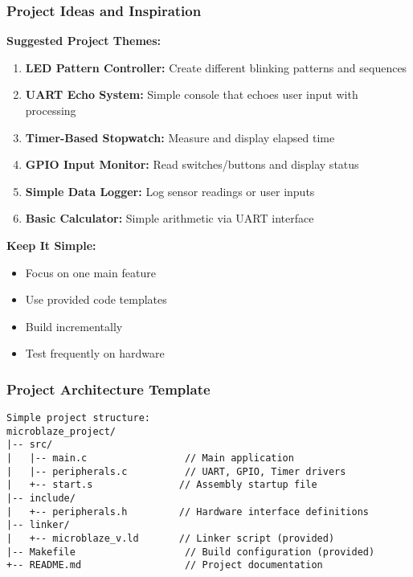 \documentclass{beamer}
\begin{document}
\begin{frame}
\frametitle{Project Ideas and Inspiration}
\small \textbf{Suggested Project Themes:}

\begin{enumerate}
    \item \footnotesize \textbf{LED Pattern Controller:} Create different blinking patterns and sequences
    \item \footnotesize \textbf{UART Echo System:} Simple console that echoes user input with processing
    \item \footnotesize \textbf{Timer-Based Stopwatch:} Measure and display elapsed time
    \item \footnotesize \textbf{GPIO Input Monitor:} Read switches/buttons and display status
    \item \footnotesize \textbf{Simple Data Logger:} Log sensor readings or user inputs
    \item \footnotesize \textbf{Basic Calculator:} Simple arithmetic via UART interface
\end{enumerate}

\vspace{0.3cm}
\small \textbf{Keep It Simple:}
\begin{itemize}
    \item \footnotesize Focus on one main feature
    \item \footnotesize Use provided code templates
    \item \footnotesize Build incrementally
    \item \footnotesize Test frequently on hardware
\end{itemize}
\end{frame}

\begin{frame}[fragile]
\frametitle{Project Architecture Template}
\begin{lstlisting}[basicstyle=\tiny\ttfamily]
Simple project structure:
microblaze_project/
|-- src/
|   |-- main.c                 // Main application
|   |-- peripherals.c          // UART, GPIO, Timer drivers
|   +-- start.s               // Assembly startup file
|-- include/
|   +-- peripherals.h         // Hardware interface definitions
|-- linker/
|   +-- microblaze_v.ld       // Linker script (provided)
|-- Makefile                   // Build configuration (provided)
+-- README.md                  // Project documentation
\end{lstlisting}
\end{frame}
\end{document}
